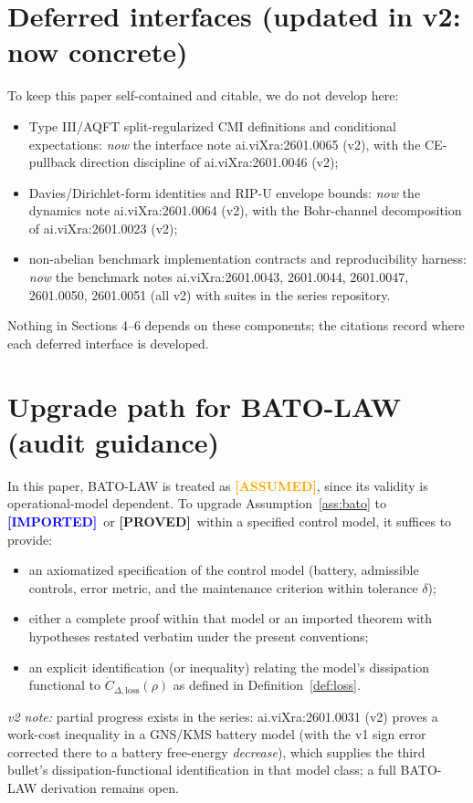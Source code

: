 \documentclass[11pt]{article}
\theoremstyle{definition}
\theoremstyle{remark}
\newcommand{\ASSUMED}{\textcolor{orange}{\textbf{[ASSUMED]}}}
\newcommand{\PROVED}{\textcolor{green!60!black}{\textbf{[PROVED]}}}
\newcommand{\IMPORTED}{\textcolor{blue}{\textbf{[IMPORTED]}}}
\begin{document}
\section{Deferred interfaces (updated in v2: now concrete)}
\label{app:deferred}

To keep this paper self-contained and citable, we do not develop here:
\begin{itemize}
\item Type III/AQFT split-regularized CMI definitions and conditional
expectations: \emph{now} the interface note ai.viXra:2601.0065 (v2),
with the CE-pullback direction discipline of ai.viXra:2601.0046 (v2);
\item Davies/Dirichlet-form identities and RIP-U envelope bounds:
\emph{now} the dynamics note ai.viXra:2601.0064 (v2), with the
Bohr-channel decomposition of ai.viXra:2601.0023 (v2);
\item non-abelian benchmark implementation contracts and reproducibility
harness: \emph{now} the benchmark notes ai.viXra:2601.0043, 2601.0044,
2601.0047, 2601.0050, 2601.0051 (all v2) with suites in the series
repository.
\end{itemize}
Nothing in Sections 4--6 depends on these components; the citations
record where each deferred interface is developed.

\section{Upgrade path for BATO-LAW (audit guidance)}
\label{app:bato}

In this paper, BATO-LAW is treated as \ASSUMED, since its validity is
operational-model dependent. To upgrade Assumption~\ref{ass:bato} to
\IMPORTED\ or \PROVED\ within a specified control model, it suffices to
provide:
\begin{itemize}
\item an axiomatized specification of the control model (battery,
admissible controls, error metric, and the maintenance criterion within
tolerance $\delta$);
\item either a complete proof within that model or an imported theorem
with hypotheses restated verbatim under the present conventions;
\item an explicit identification (or inequality) relating the model's
dissipation functional to $\dot{C}_{\Delta,\mathrm{loss}}(\rho)$ as
defined in Definition~\ref{def:loss}.
\end{itemize}
\emph{v2 note:} partial progress exists in the series:
ai.viXra:2601.0031 (v2) proves a work-cost inequality in a GNS/KMS
battery model (with the v1 sign error corrected there to a battery
free-energy \emph{decrease}), which supplies the third bullet's
dissipation-functional identification in that model class; a full
BATO-LAW derivation remains open.
\end{document}
